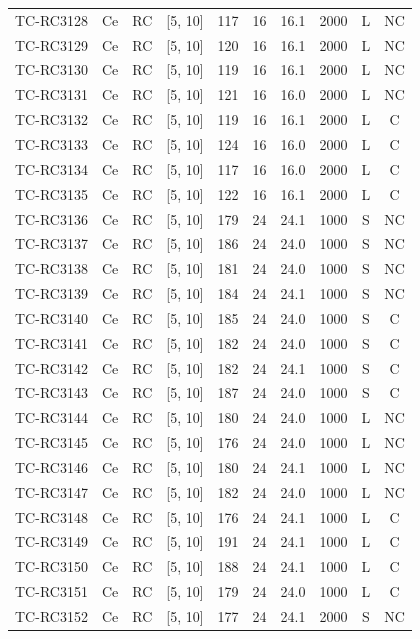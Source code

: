 \begin{longtable}{lccccccccc}
TC-RC3128 & Ce & RC & [5, 10] & 117 & 16 & 16.1 & 2000 & L & NC \\
TC-RC3129 & Ce & RC & [5, 10] & 120 & 16 & 16.1 & 2000 & L & NC \\
TC-RC3130 & Ce & RC & [5, 10] & 119 & 16 & 16.1 & 2000 & L & NC \\
TC-RC3131 & Ce & RC & [5, 10] & 121 & 16 & 16.0 & 2000 & L & NC \\
TC-RC3132 & Ce & RC & [5, 10] & 119 & 16 & 16.1 & 2000 & L & C \\
TC-RC3133 & Ce & RC & [5, 10] & 124 & 16 & 16.0 & 2000 & L & C \\
TC-RC3134 & Ce & RC & [5, 10] & 117 & 16 & 16.0 & 2000 & L & C \\
TC-RC3135 & Ce & RC & [5, 10] & 122 & 16 & 16.1 & 2000 & L & C \\
TC-RC3136 & Ce & RC & [5, 10] & 179 & 24 & 24.1 & 1000 & S & NC \\
TC-RC3137 & Ce & RC & [5, 10] & 186 & 24 & 24.0 & 1000 & S & NC \\
TC-RC3138 & Ce & RC & [5, 10] & 181 & 24 & 24.0 & 1000 & S & NC \\
TC-RC3139 & Ce & RC & [5, 10] & 184 & 24 & 24.1 & 1000 & S & NC \\
TC-RC3140 & Ce & RC & [5, 10] & 185 & 24 & 24.0 & 1000 & S & C \\
TC-RC3141 & Ce & RC & [5, 10] & 182 & 24 & 24.0 & 1000 & S & C \\
TC-RC3142 & Ce & RC & [5, 10] & 182 & 24 & 24.1 & 1000 & S & C \\
TC-RC3143 & Ce & RC & [5, 10] & 187 & 24 & 24.0 & 1000 & S & C \\
TC-RC3144 & Ce & RC & [5, 10] & 180 & 24 & 24.0 & 1000 & L & NC \\
TC-RC3145 & Ce & RC & [5, 10] & 176 & 24 & 24.0 & 1000 & L & NC \\
TC-RC3146 & Ce & RC & [5, 10] & 180 & 24 & 24.1 & 1000 & L & NC \\
TC-RC3147 & Ce & RC & [5, 10] & 182 & 24 & 24.0 & 1000 & L & NC \\
TC-RC3148 & Ce & RC & [5, 10] & 176 & 24 & 24.1 & 1000 & L & C \\
TC-RC3149 & Ce & RC & [5, 10] & 191 & 24 & 24.1 & 1000 & L & C \\
TC-RC3150 & Ce & RC & [5, 10] & 188 & 24 & 24.1 & 1000 & L & C \\
TC-RC3151 & Ce & RC & [5, 10] & 179 & 24 & 24.0 & 1000 & L & C \\
TC-RC3152 & Ce & RC & [5, 10] & 177 & 24 & 24.1 & 2000 & S & NC \\

\end{longtable}

